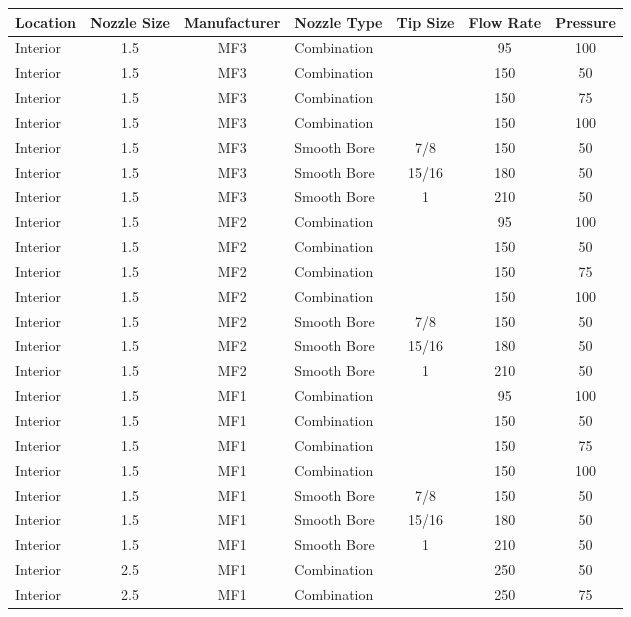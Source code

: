 \documentclass{article}
\begin{document}
\begin{table}[]
\centering
\begin{tabular}{|lcclccc|}
\hline
\multicolumn{1}{|c|}{\textbf{Location}} & \multicolumn{1}{c|}{\textbf{Nozzle Size}} & \multicolumn{1}{c|}{\textbf{Manufacturer}} & \multicolumn{1}{c|}{\textbf{Nozzle Type}} & \multicolumn{1}{c|}{\textbf{Tip Size}} & \multicolumn{1}{c|}{\textbf{Flow Rate}} & \textbf{Pressure} \\ \hline
Interior & 1.5 & MF3 & Combination &  & 95 & 100 \\
Interior & 1.5 & MF3 & Combination &  & 150 & 50 \\
Interior & 1.5 & MF3 & Combination &  & 150 & 75 \\
Interior & 1.5 & MF3 & Combination &  & 150 & 100 \\
Interior & 1.5 & MF3 & Smooth Bore & 7/8 & 150 & 50 \\
Interior & 1.5 & MF3 & Smooth Bore & 15/16 & 180 & 50 \\
Interior & 1.5 & MF3 & Smooth Bore & 1 & 210 & 50 \\
Interior & 1.5 & MF2 & Combination &  & 95 & 100 \\
Interior & 1.5 & MF2 & Combination &  & 150 & 50 \\
Interior & 1.5 & MF2 & Combination &  & 150 & 75 \\
Interior & 1.5 & MF2 & Combination &  & 150 & 100 \\
Interior & 1.5 & MF2 & Smooth Bore & 7/8 & 150 & 50 \\
Interior & 1.5 & MF2 & Smooth Bore & 15/16 & 180 & 50 \\
Interior & 1.5 & MF2 & Smooth Bore & 1 & 210 & 50 \\
Interior & 1.5 & MF1 & Combination &  & 95 & 100 \\
Interior & 1.5 & MF1 & Combination &  & 150 & 50 \\
Interior & 1.5 & MF1 & Combination &  & 150 & 75 \\
Interior & 1.5 & MF1 & Combination &  & 150 & 100 \\
Interior & 1.5 & MF1 & Smooth Bore & 7/8 & 150 & 50 \\
Interior & 1.5 & MF1 & Smooth Bore & 15/16 & 180 & 50 \\
Interior & 1.5 & MF1 & Smooth Bore & 1 & 210 & 50 \\
Interior & 2.5 & MF1 & Combination &  & 250 & 50 \\
Interior & 2.5 & MF1 & Combination &  & 250 & 75 \\

\end{tabular}
\end{table}
\end{document}
